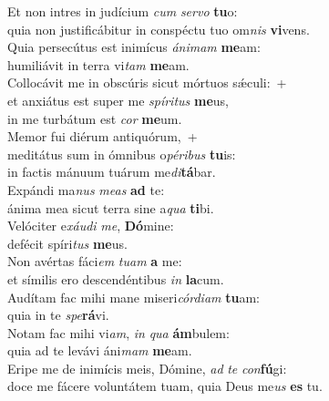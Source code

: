 \evenverse Et non intres in judícium \textit{cum} \textit{ser}\textit{vo} \textbf{tu}o:~\*\\
\evenverse quia non justificábitur in conspéctu tuo om\textit{nis} \textbf{vi}vens.\\
\oddverse Quia persecútus est inimícus \textit{á}\textit{ni}\textit{mam} \textbf{me}am:~\*\\
\oddverse humiliávit in terra vi\textit{tam} \textbf{me}am.\\
\evenverse Collocávit me in obscúris sicut mórtuos sǽculi:~+\\
\evenverse  et anxiátus est super me \textit{spí}\textit{ri}\textit{tus} \textbf{me}us,~\*\\
\evenverse in me turbátum est \textit{cor} \textbf{me}um.\\
\oddverse Memor fui diérum antiquórum,~+\\
\oddverse  meditátus sum in ómnibus o\textit{pé}\textit{ri}\textit{bus} \textbf{tu}is:~\*\\
\oddverse in factis mánuum tuárum me\textit{di}\textbf{tá}bar.\\
\evenverse Expándi ma\textit{nus} \textit{me}\textit{as} \textbf{ad} te:~\*\\
\evenverse ánima mea sicut terra sine a\textit{qua} \textbf{ti}bi.\\
\oddverse Velóciter e\textit{xáu}\textit{di} \textit{me}, \textbf{Dó}mine:~\*\\
\oddverse defécit spíri\textit{tus} \textbf{me}us.\\
\evenverse Non avértas fáci\textit{em} \textit{tu}\textit{am} \textbf{a} me:~\*\\
\evenverse et símilis ero descendéntibus \textit{in} \textbf{la}cum.\\
\oddverse Audítam fac mihi mane miseri\textit{cór}\textit{di}\textit{am} \textbf{tu}am:~\*\\
\oddverse quia in te \textit{spe}\textbf{rá}vi.\\
\evenverse Notam fac mihi vi\textit{am}, \textit{in} \textit{qua} \textbf{ám}bulem:~\*\\
\evenverse quia ad te levávi áni\textit{mam} \textbf{me}am.\\
\oddverse Eripe me de inimícis meis, Dómine, \textit{ad} \textit{te} \textit{con}\textbf{fú}gi:~\*\\
\oddverse doce me fácere voluntátem tuam, quia Deus me\textit{us} \textbf{es} tu.\\
